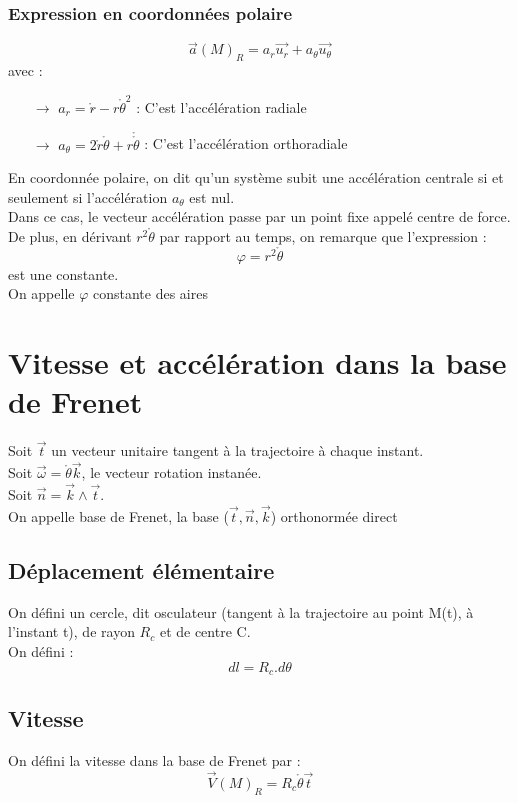 \subsubsection{Expression en coordonnées polaire}
$$\overrightarrow{a}(M)_R = a_r\overrightarrow{u_r} + a_{\theta}\overrightarrow{u_{\theta}}$$
avec : 
\begin{itemize}
 \item[$\rightarrow$] $a_r = \mathring{r}\mathring{} - r\mathring{\theta}^2$ : C'est l'accélération radiale
 \item[$\rightarrow$] $a_{\theta} = 2\mathring{r}\mathring{\theta} + r\mathring{\mathring{\theta}}$ : C'est l'accélération orthoradiale
\end{itemize}
En coordonnée polaire, on dit qu'un système subit une accélération centrale si et seulement si l'accélération $a_{\theta}$ est nul. \\
Dans ce cas, le vecteur accélération passe par un point fixe appelé centre de force.\\
De plus, en dérivant $r^2\mathring{\theta}$ par rapport au temps, on remarque que l'expression :
$$\varphi = r^2\mathring{\theta} $$
est une constante.\\
On appelle $\varphi$ constante des aires
\section{Vitesse et accélération dans la base de Frenet}
\begin{de}
Soit $\overrightarrow{t}$ un vecteur unitaire tangent à la trajectoire à chaque instant.\\
Soit $\overrightarrow{\omega} = \mathring{\theta}\overrightarrow{k}$, le vecteur rotation instanée.\\
Soit $\overrightarrow{n}=\overrightarrow{k}\wedge\overrightarrow{t}$.\\
On appelle base de Frenet, la base ($\overrightarrow{t},\overrightarrow{n},\overrightarrow{k}$) orthonormée direct
\end{de}
\subsection{Déplacement élémentaire}
On défini un cercle, dit osculateur (tangent à la trajectoire au point M(t), à l'instant t), de rayon $R_c$ et de centre C.\\
On défini :
$$dl = R_c.d\theta$$
\subsection{Vitesse}
On défini la vitesse dans la base de Frenet par :
$$\overrightarrow{V}(M)_R = R_c\mathring{\theta}\overrightarrow{t}$$
